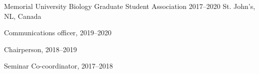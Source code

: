 \begin{cventries}

    

    
  \cventry
    {Memorial University} %
    {Biology Graduate Student Association} %
    {2017--2020} %
    {St. John's, NL, Canada} %
    {
      \begin{cvitems}
          \item Communications officer, 2019--2020
          \item Chairperson, 2018--2019
          \item Seminar Co-coordinator, 2017--2018
      \end{cvitems}
      }

    


\end{cventries}
